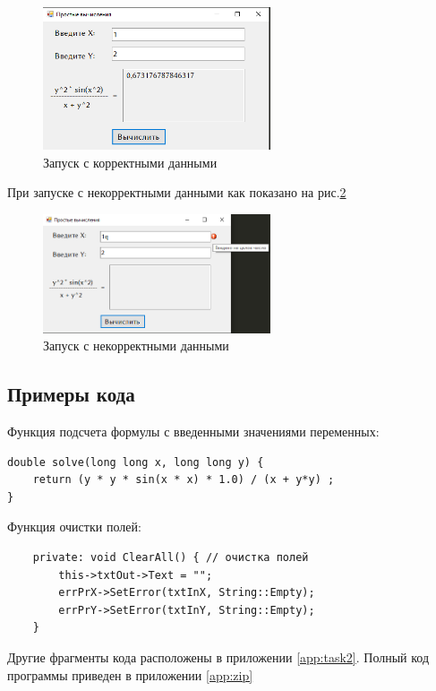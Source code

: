 \begin{figure}[!h]
    \centering
    \includegraphics[width = 0.6\textwidth]{images/Task2/Works1.png}
    \caption{Запуск с корректными данными}
    \label{fig:WorkForm2}
\end{figure}

При запуске с некорректными данными как показано на рис.\ref{fig:BadInputNotIntForm2}

\begin{figure}[!h]
    \centering
    \includegraphics[width = 0.6\textwidth]{images/Task2/BadInputNotInt1.png}
    \caption{Запуск с некорректными данными}
    \label{fig:BadInputNotIntForm2}
\end{figure}

\subsection{Примеры кода}

Функция подсчета формулы с введенными значениями переменных:

\begin{verbatim}
double solve(long long x, long long y) {
	return (y * y * sin(x * x) * 1.0) / (x + y*y) ;
}
\end{verbatim}

Функция очистки полей:

\begin{verbatim}
	private: void ClearAll() { // очистка полей
		this->txtOut->Text = "";
		errPrX->SetError(txtInX, String::Empty);
		errPrY->SetError(txtInY, String::Empty);
	}
\end{verbatim}

Другие фрагменты кода расположены в приложении \ref{app:task2}. Полный код программы приведен в приложении \ref{app:zip}
